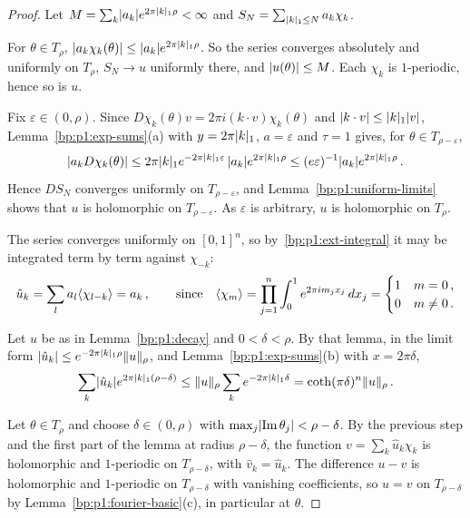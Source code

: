 \begin{proof}
Let $M=\sum_k\lvert a_k\rvert e^{2\pi\lvert k\rvert_1\rho}<\infty$ and $S_N=\sum_{\lvert k\rvert_1\le N}a_k\chi_k$.

\label{step:p1:sum-bound}
For $\theta\in T_\rho$, $\lvert a_k\chi_k(\theta)\rvert\le\lvert a_k\rvert e^{2\pi\lvert k\rvert_1\rho}$. So the series converges
absolutely and uniformly on $T_\rho$, $S_N\to u$ uniformly there, and $\lvert u(\theta)\rvert\le M$. Each
$\chi_k$ is $1$-periodic, hence so is $u$.

\label{step:p1:sum-holo}
Fix $\varepsilon\in(0,\rho)$. Since $D\chi_k(\theta)v=2\pi i(k\cdot v)\chi_k(\theta)$ and
$\lvert k\cdot v\rvert\le\lvert k\rvert_1\lvert v\rvert$, Lemma~\ref{bp:p1:exp-sums}(a) with $y=2\pi\lvert k\rvert_1$, $a=\varepsilon$ and
$\tau=1$ gives, for $\theta\in T_{\rho-\varepsilon}$,
\begin{equation*}
\lvert a_kD\chi_k(\theta)\rvert\le2\pi\lvert k\rvert_1e^{-2\pi\lvert k\rvert_1\varepsilon}\,\lvert a_k\rvert e^{2\pi\lvert k\rvert_1\rho}\le
(e\varepsilon)^{-1}\lvert a_k\rvert e^{2\pi\lvert k\rvert_1\rho}\,.
\end{equation*}
Hence $DS_N$ converges uniformly on $T_{\rho-\varepsilon}$, and Lemma~\ref{bp:p1:uniform-limits} shows
that $u$ is holomorphic on $T_{\rho-\varepsilon}$. As $\varepsilon$ is arbitrary, $u$ is holomorphic on
$T_\rho$.

\label{step:p1:sum-coeff}
The series converges uniformly on $[0,1]^n$, so by~\ref{bp:p1:ext-integral} it may be integrated
term by term against $\chi_{-k}$:
\begin{equation*}
\hat u_k=\sum_la_l\langle \chi_{l-k}\rangle=a_k\,,\qquad\text{since}\quad
\langle \chi_m\rangle=\prod_{j=1}^n\int_0^1e^{2\pi im_jx_j}\,dx_j=\begin{cases}1&m=0\,,\\0&m\ne0\,.\end{cases}
\end{equation*}

\label{step:p1:sum-converse}
Let $u$ be as in Lemma~\ref{bp:p1:decay} and $0<\delta<\rho$. By that lemma, in the limit form
$\lvert \hat u_k\rvert\le e^{-2\pi\lvert k\rvert_1\rho}\lVert u\rVert_\rho$, and Lemma~\ref{bp:p1:exp-sums}(b) with $x=2\pi\delta$,
\begin{equation*}
\sum_k\lvert \hat u_k\rvert e^{2\pi\lvert k\rvert_1(\rho-\delta)}\le\lVert u\rVert_\rho\sum_ke^{-2\pi\lvert k\rvert_1\delta}
=\coth(\pi\delta)^n\lVert u\rVert_\rho\,.
\end{equation*}

\label{step:p1:sum-representation}
Let $\theta\in T_\rho$ and choose $\delta\in(0,\rho)$ with $\max_j\lvert \operatorname{Im}\theta_j\rvert<\rho-\delta$.
By the previous step and the first part of the lemma at radius $\rho-\delta$, the function
$v=\sum_k\hat u_k\chi_k$ is holomorphic and $1$-periodic on $T_{\rho-\delta}$, with $\hat v_k=\hat u_k$. The
difference $u-v$ is holomorphic and $1$-periodic on $T_{\rho-\delta}$ with vanishing coefficients, so
$u=v$ on $T_{\rho-\delta}$ by Lemma~\ref{bp:p1:fourier-basic}(c), in particular at $\theta$.
\end{proof}

